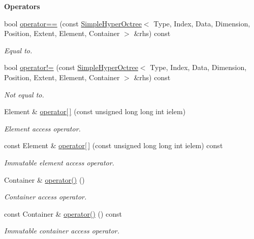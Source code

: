 \begin{Indent}{\bf Operators}\par
\begin{DoxyCompactItemize}
\item 
bool \hyperlink{exceptionmagrathea_1_1SimpleHyperOctree_a27db33e24489e304260fcbf7f2b611db}{operator==} (const \hyperlink{exceptionmagrathea_1_1SimpleHyperOctree}{Simple\-Hyper\-Octree}$<$ Type, Index, Data, Dimension, Position, Extent, Element, Container $>$ \&rhs) const 
\begin{DoxyCompactList}\small\item\em Equal to. \end{DoxyCompactList}\item 
bool \hyperlink{exceptionmagrathea_1_1SimpleHyperOctree_aa5188e6834212f3af00aaa4356af340a}{operator!=} (const \hyperlink{exceptionmagrathea_1_1SimpleHyperOctree}{Simple\-Hyper\-Octree}$<$ Type, Index, Data, Dimension, Position, Extent, Element, Container $>$ \&rhs) const 
\begin{DoxyCompactList}\small\item\em Not equal to. \end{DoxyCompactList}\item 
Element \& \hyperlink{exceptionmagrathea_1_1SimpleHyperOctree_acd9451336184134d932aeca43e65b114}{operator\mbox{[}$\,$\mbox{]}} (const unsigned long long int ielem)
\begin{DoxyCompactList}\small\item\em Element access operator. \end{DoxyCompactList}\item 
const Element \& \hyperlink{exceptionmagrathea_1_1SimpleHyperOctree_a4156fe14aca770ad2bd669604f1cf487}{operator\mbox{[}$\,$\mbox{]}} (const unsigned long long int ielem) const 
\begin{DoxyCompactList}\small\item\em Immutable element access operator. \end{DoxyCompactList}\item 
Container \& \hyperlink{exceptionmagrathea_1_1SimpleHyperOctree_aae309b8b0d1d991611e9c338f3779bdc}{operator()} ()
\begin{DoxyCompactList}\small\item\em Container access operator. \end{DoxyCompactList}\item 
const Container \& \hyperlink{exceptionmagrathea_1_1SimpleHyperOctree_a7aa2ae9007464b1c2a451c8ebd9e88c3}{operator()} () const 
\begin{DoxyCompactList}\small\item\em Immutable container access operator. \end{DoxyCompactList}\item 

\end{DoxyCompactItemize}
\end{Indent}
